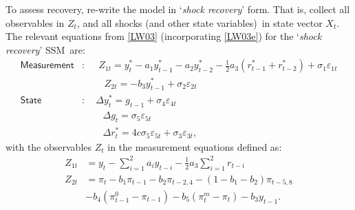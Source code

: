 \documentclass[a4paper,12pt]{article}
\newcommand{\bsq}{\begin{subequations}}\newcommand{\esq}{\end{subequations}}
\newcommand{\vsp}[1]{\vspace*{#1mm}}\newcommand{\hsp}[1]{\hspace*{#1mm}}  }
\begin{document}
To assess recovery, re-write the model in `\emph{shock recovery}' form. That
is, collect all observables in $Z_{t}$, and all shocks (and other state
variables)\ in state vector $X_{t}$. The relevant equations from \ref{LW03}
(incorporating \ref{LW03e}) for the `\emph{shock recovery}' SSM\ are:\bsq%
\label{ssm0}%
\begin{align}
\mathsf{Measurement}& :\;\quad Z_{1t}=y_{t}^{\ast }-a_{1}y_{t-1}^{\ast
}-a_{2}y_{t-2}^{\ast }-\tfrac{1}{2}a_{3}\left( r_{t-1}^{\ast }+r_{t-2}^{\ast
}\right) +\sigma _{1}\varepsilon _{1t} \\
\phantom{\mathsf{Measurement}}& \,\,\;\;\phantom{:\quad}%
Z_{2t}=-b_{3}y_{t-1}^{\ast }+\sigma _{2}\varepsilon _{2t} \\
\mathsf{State}& :\quad \Delta y_{t}^{\ast }=g_{t-1}+\sigma _{4}\varepsilon
_{4t} \\
\phantom{\mathsf{State}}& \;\,\;\phantom{:\quad}\Delta g_{t}=\sigma
_{5}\varepsilon _{5t} \\
\phantom{\mathsf{State}}& \;\,\;\phantom{:\quad}\Delta r_{t}^{\ast
}=4c\sigma _{5}\varepsilon _{5t}+\sigma _{3}\varepsilon _{3t},
\end{align}%
\esq with the observables $Z_{t}$ in the measurement equations defined as:%
\vsp{-3} 
\begin{align*}
Z_{1t}& =y_{t}-\sum_{i=1}^{2}a_{i}y_{t-i}-\tfrac{1}{2}a_{3}%
\sum_{i=1}^{2}r_{t-i} \\
Z_{2t}& =\pi _{t}-b_{1}\pi _{t-1}-b_{2}\pi _{t-2,4}-\left(
1-b_{1}-b_{2}\right) \pi _{t-5,8} \\
& -b_{4}(\pi _{t-1}^{0}-\pi _{t-1})-b_{5}\left( \pi _{t}^{m}-\pi _{t}\right)
-b_{3}y_{t-1}.
\end{align*}
\end{document}
